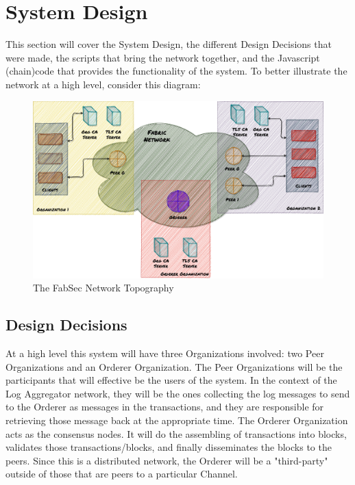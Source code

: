 \section{System Design}
	\hspace{10mm}This section will cover the System Design, the different Design Decisions that were made, the scripts that bring the network together, and the Javascript (chain)code that provides the functionality of the system. To better illustrate the network at a high level, consider this diagram:\\
	
	\begin{figure}[h!]
		\includegraphics[width=\textwidth]{./fabsec-report-system-design/fabric-network-diagram.png}
		\caption{The FabSec Network Topography}
	\end{figure}
	
	\subsection{Design Decisions}
		\hspace{10mm}At a high level this system will have three Organizations involved: two Peer Organizations and an Orderer Organization. The Peer Organizations will be the participants that will effective be the users of the system. In the context of the Log Aggregator network, they will be the ones collecting the log messages to send to the Orderer as messages in the transactions, and they are responsible for retrieving those message back at the appropriate time. The Orderer Organization acts as the consensus nodes. It will do the assembling of transactions into blocks, validates those transactions/blocks, and finally disseminates the blocks to the peers. Since this is a distributed network, the Orderer will be a "third-party" outside of those that are peers to a particular Channel.\\
	
